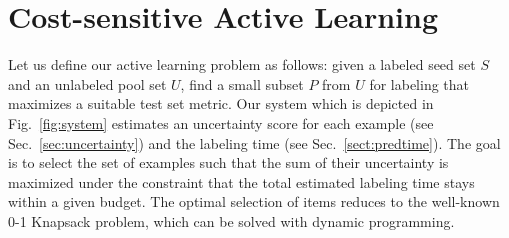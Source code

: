 \documentclass{llncs}
\begin{document}
\vspace*{-0.2cm}
\section{Cost-sensitive Active Learning}
\vspace*{-0.2cm}

Let us define our active learning problem as follows: given a labeled seed set $S$ and an unlabeled pool set $U$, find a small subset $P$ from $U$ for labeling that maximizes a suitable test set metric. Our system which is depicted in Fig.~\ref{fig:system} estimates an uncertainty score for each example (see Sec.~\ref{sec:uncertainty}) and the labeling time (see Sec.~\ref{sect:predtime}). The goal is to select the set of examples such that the sum of their uncertainty is maximized under the constraint that the total estimated labeling time stays within a given budget. The optimal selection of items reduces to the well-known 0-1 Knapsack problem, which can be solved with dynamic programming.




\end{document}
